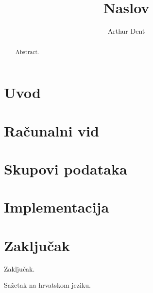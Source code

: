 \documentclass[times, utf8, diplomski]{fer}
\begin{document}

\title{Naslov}

\author{Arthur Dent}

\maketitle

\izvornik

\zahvala{}

\tableofcontents

\chapter{Uvod}


\chapter{Računalni vid}
%
%
%

%

\chapter{Skupovi podataka}

\chapter{Implementacija}

\chapter{Zaključak}
Zaključak.




\begin{sazetak}
Sažetak na hrvatskom jeziku.

\end{sazetak}

\begin{abstract}
Abstract.

\end{abstract}
\end{document}
